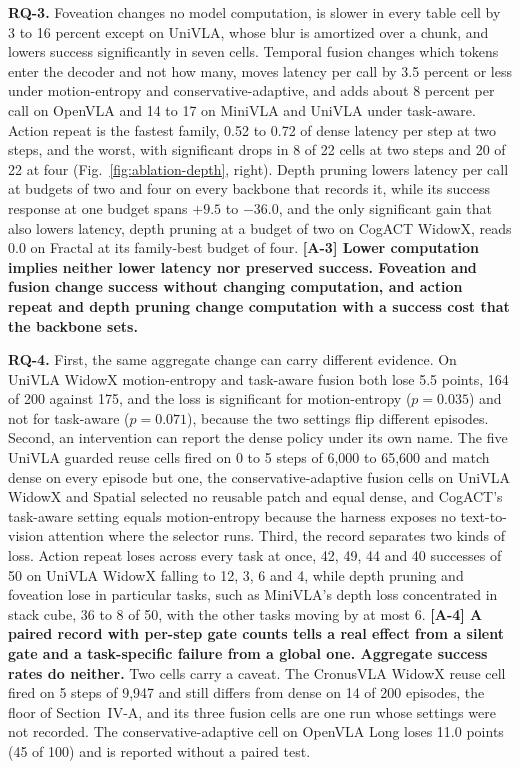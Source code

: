 \documentclass[letterpaper, 10 pt, conference]{ieeeconf}
\begin{document}
\textbf{RQ-3.} Foveation changes no model computation, is slower in every table cell by 3
to 16 percent except on UniVLA, whose blur is amortized over a chunk, and
lowers success significantly in seven cells. Temporal fusion changes which
tokens enter the decoder and not how many, moves latency per call by 3.5
percent or less under motion-entropy and conservative-adaptive, and adds
about 8 percent per call on OpenVLA and 14 to 17 on MiniVLA and UniVLA
under task-aware. Action repeat is the fastest family, 0.52 to 0.72 of
dense latency per step at two steps, and the worst, with significant drops
in 8 of 22 cells at two steps and 20 of 22 at four
(Fig.~\ref{fig:ablation-depth}, right). Depth pruning lowers latency per call at
budgets of two and four on every backbone that records it, while its
success response at one budget spans $+9.5$ to $-36.0$, and the only
significant gain that also lowers latency, depth pruning at a budget of two
on CogACT WidowX, reads 0.0 on Fractal at its family-best budget of four.
\textbf{[A-3] Lower computation implies neither lower latency nor preserved
success. Foveation and fusion change success without changing
computation, and action repeat and depth pruning change computation with a
success cost that the backbone sets.}

\textbf{RQ-4.} First, the same aggregate change can carry different evidence. On
UniVLA WidowX motion-entropy and task-aware fusion both lose 5.5 points,
164 of 200 against 175, and the loss is significant for motion-entropy
($p = 0.035$) and not for task-aware ($p = 0.071$), because the two
settings flip different episodes. Second, an intervention can report the
dense policy under its own name. The five UniVLA guarded reuse cells fired
on 0 to 5 steps of 6,000 to 65,600 and match dense on every episode but
one, the conservative-adaptive fusion cells on UniVLA WidowX and Spatial
selected no reusable patch and equal dense, and CogACT's task-aware
setting equals motion-entropy because the harness exposes no
text-to-vision attention where the selector runs. Third, the record
separates two kinds of loss. Action repeat loses across every task at
once, 42, 49, 44 and 40 successes of 50 on UniVLA WidowX falling to 12, 3,
6 and 4, while depth pruning and foveation lose in particular tasks, such
as MiniVLA's depth loss concentrated in stack cube, 36 to 8 of 50, with
the other tasks moving by at most 6. \textbf{[A-4] A paired record with per-step
gate counts tells a real effect from a silent gate and a task-specific
failure from a global one. Aggregate success rates do neither.} Two cells
carry a caveat. The CronusVLA WidowX reuse cell fired on 5 steps of 9,947
and still differs from dense on 14 of 200 episodes, the floor of
Section~IV-A, and its three fusion cells are one run whose settings were
not recorded. The conservative-adaptive cell on OpenVLA Long loses 11.0
points (45 of 100) and is reported without a paired test.
\end{document}

